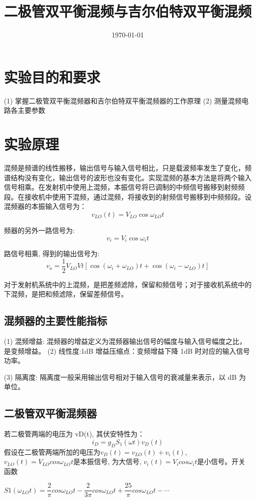 \documentclass{../source/Experiment}
\title{二极管双平衡混频与吉尔伯特双平衡混频}
\date{\today}
\begin{document}
\section{实验目的和要求}
    (1) 掌握二极管双平衡混频器和吉尔伯特双平衡混频器的工作原理
    (2) 测量混频电路各主要参数
    

    \section{实验原理}
    混频是频谱的线性搬移，输出信号与输入信号相比，只是载波频率发生了变化，频谱结构没有变化，输出信号的波形也没有变化。实现混频的基本方法是将两个输入信号相乘。在发射机中使用上混频，本振信号将已调制的中频信号搬移到射频频段。在接收机中使用下混频，通过混频，将接收到的射频信号搬移到中频频段。设混频器的本振输入信号为：
    $$
    v_{L O}(t)=V_{L O} \cos \omega_{L O} t
    $$

    频器的另外一路信号为:
    $$
    v_{i}=V_{i} \cos \omega_{i} t
    $$

    路信号相乘, 得到的输出信号为:
    $$
    v_{o}=\frac{1}{2} V_{L O} V t\left[\cos \left(\omega_{i}+\omega_{L O}\right) t+\cos \left(\omega_{i}-\omega_{L O}\right) t\right]
    $$

    对于发射机系统中的上混频，是把差频滤除，保留和频信号；对于接收机系统中的下混频，是把和频滤除，保留差频信号。

    \subsection{混频器的主要性能指标}
    (1) 混频增益: 混频器的增益定义为混频器输出信号的幅度与输入信号幅度之比，是变频增益。
    (2) 线性度:1dB 增益压缩点：变频增益下降 1dB 时对应的输入信号功率。

    (3) 隔离度: 隔离度一般采用输出信号相对于输入信号的衰减量来表示，以 dB 为单位。

    \subsection{二极管双平衡混频器}
    若二极管两端的电压为 vD(t), 其伏安特性为：
    $$
    i_D = g_DS_1(\omega t)v_D(t)
    $$
    假设在二极管两端所加的电压为$ v_D(t) = v_{LO}(t) + v_i(t)$, $v_{LO}(t) = V_{LO} cos \omega_{LO}t $是本振信号, 为大信号,
    $v_i(t) = V_i cos \omega_it $是小信号。开关函数

    $ S1 (\omega_{LO}t) = \dfrac{2}{\pi} cos \omega_{LO}t −\dfrac{2}{3\pi} cos \omega_{LO}t + \dfrac{25}{\pi}cos \omega_{LO}t − \cdots $
\end{document}
